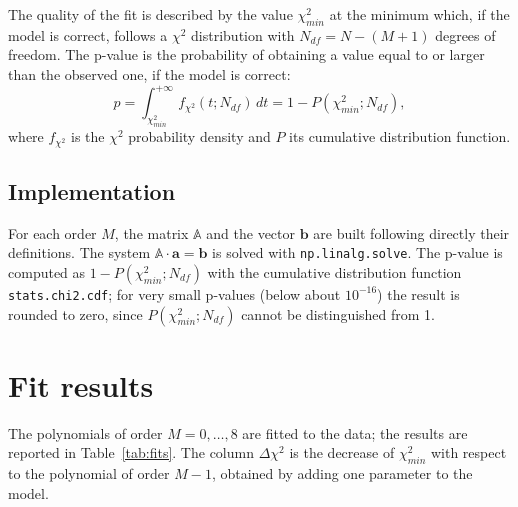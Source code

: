 \documentclass[11pt,a4paper]{article}
\begin{document}
	The quality of the fit is described by the value $\chi^2_{min}$ at the minimum which, if the model is correct, follows a $\chi^2$ distribution with $N_{df} = N - (M+1)$ degrees of freedom.
	The p-value is the probability of obtaining a value equal to or larger than the observed one, if the model is correct:
	\begin{equation}
		p = \int_{\chi^2_{min}}^{+\infty} f_{\chi^2}(t; N_{df})\, dt = 1 - P(\chi^2_{min}; N_{df}),
	\end{equation}
	where $f_{\chi^2}$ is the $\chi^2$ probability density and $P$ its cumulative distribution function.

	\subsection*{Implementation}

	For each order $M$, the matrix $\mathbb{A}$ and the vector $\mathbf{b}$ are built following directly their definitions.
	The system $\mathbb{A}\cdot\mathbf{a} = \mathbf{b}$ is solved with \texttt{np.linalg.solve}.
	The p-value is computed as $1 - P(\chi^2_{min}; N_{df})$ with the cumulative distribution function \texttt{stats.chi2.cdf}; for very small p-values (below about $10^{-16}$) the result is rounded to zero, since $P(\chi^2_{min}; N_{df})$ cannot be distinguished from 1.

	\section*{Fit results}

	The polynomials of order $M = 0, \dots, 8$ are fitted to the data; the results are reported in Table~\ref{tab:fits}.
	The column $\Delta\chi^2$ is the decrease of $\chi^2_{min}$ with respect to the polynomial of order $M-1$, obtained by adding one parameter to the model.
\end{document}
